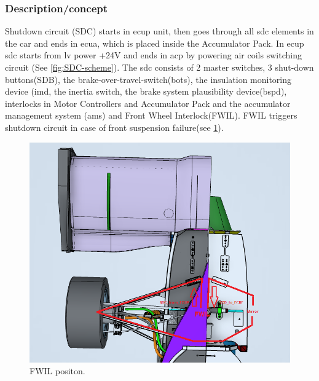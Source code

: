
\subsubsection{Description/concept}

Shutdown circuit (SDC) starts in \gls{ecup} unit, then goes through all \gls{sdc} elements in the car and ends in \gls{ecua}, which is placed inside the Accumulator Pack. In \gls{ecup} \gls{sdc} starts from \gls{lv} power +24V and ends in \gls{acp} by powering \gls{air} coils switching circuit (See \ref{fig:SDC-scheme}). The \gls{sdc} consists of 2 master switches, 3 shut-down buttons(SDB), the brake-over-travel-switch(\gls{bots}), the insulation monitoring device (\gls{imd}, the inertia switch, the brake system plausibility device(\gls{bspd}), interlocks in Motor Controllers and Accumulator Pack and the accumulator management system (\gls{ams}) and Front Wheel Interlock(FWIL). FWIL triggers shutdown circuit in case of front suspension failure(see \ref{fig:fwil}). 

\begin{figure}[H]
	\includegraphics[width=\textwidth]{./img/fwil.png}
	\caption{FWIL positon.}
	\label{fig:fwil}
\end{figure}

